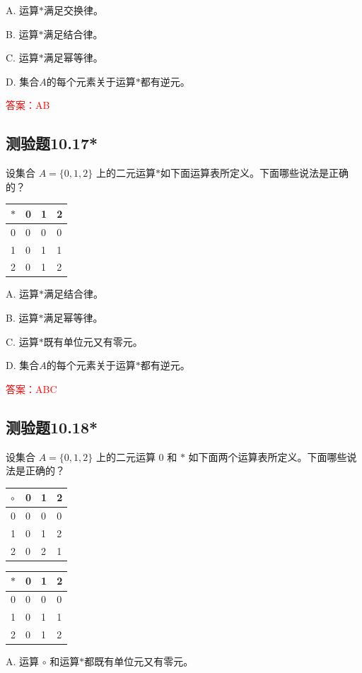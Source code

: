 \documentclass[UTF8, heading=true]{ctexart}
\begin{document}
A. 运算$*$满足交换律。

B. 运算$*$满足结合律。

C. 运算$*$满足幂等律。

D. 集合$A$的每个元素关于运算$*$都有逆元。

\textcolor{red}{答案：AB}

\subsection{测验题10.17*}

设集合 $A=\{0,1,2\}$ 上的二元运算$*$如下面运算表所定义。下面哪些说法是正确的？

\begin{table}[H]
  \renewcommand{\arraystretch}{1.5}
  \centering
\begin{tabular}{l|lll}
\hline$*$ & 0 & 1 & 2 \\
\hline 0 & 0 & 0 & 0 \\
1 & 0 & 1 & 1 \\
2 & 0 & 1 & 2 \\
\hline
\end{tabular}
\end{table}

A. 运算$*$满足结合律。

B. 运算$*$满足幂等律。

C. 运算$*$既有单位元又有零元。

D. 集合$A$的每个元素关于运算$*$都有逆元。

\textcolor{red}{答案：ABC}

\subsection{测验题10.18*}

设集合 $A=\{0,1,2\}$ 上的二元运算 0 和 $*$ 如下面两个运算表所定义。下面哪些说法是正确的？
  \begin{table}[H]
    \renewcommand{\arraystretch}{1.5}
    \centering
\begin{minipage}{0.45\textwidth}

  \begin{tabular}{l|lll}
  \hline
  $\circ$ & 0 & 1 & 2 \\
  \hline
  0 & 0 & 0 & 0 \\
  1 & 0 & 1 & 2 \\
  2 & 0 & 2 & 1 \\
  \hline
  \end{tabular}
\end{minipage}
\begin{minipage}{0.45\textwidth}
  \begin{tabular}{l|lll}
  \hline
  $*$ & 0 & 1 & 2 \\
  \hline
  0 & 0 & 0 & 0 \\
  1 & 0 & 1 & 1 \\
  2 & 0 & 1 & 2 \\
  \hline
  \end{tabular}

\end{minipage}
\end{table}
A. 运算 $\circ$ 和运算$*$都既有单位元又有零元。
\end{document}
